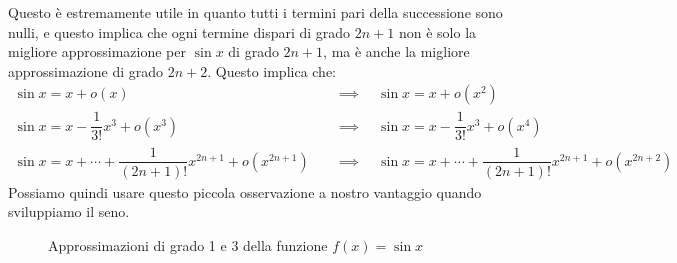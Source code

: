 Questo è estremamente utile in quanto tutti i termini pari della successione 
sono nulli, e questo implica che ogni termine dispari di grado $2n + 1$ non è 
solo la migliore approssimazione per $\sin{x}$ di grado $2n + 1$, ma è anche la 
migliore approssimazione di grado $2n + 2$. Questo implica che:
\begin{align*}
	\sin{x} = x + o(x) \quad &\implies \quad \sin{x} = x + o(x^2)\\[5pt]
	\sin{x} = x - \dfrac{1}{3!}x^3 + o(x^3) \quad &\implies \quad \sin{x} = x - 
    \dfrac{1}{3!}x^3 + o(x^4) \\[5pt]
	\sin{x} = x + \cdots + \dfrac{1}{(2n+1)!} x^{2n +1} + o(x^{2n+1}) \quad 
    &\implies \quad \sin{x} = x + \cdots + \dfrac{1}{(2n+1)!} x^{2n+1} + 
    o(x^{2n+2})
\end{align*}
Possiamo quindi usare questo piccola osservazione a nostro vantaggio quando 
sviluppiamo il seno.\\

\begin{figure}
\centering
\begin{subfigure}{0.49\textwidth}
\centering
\end{subfigure}
\begin{subfigure}{0.49\textwidth}
\centering
\end{subfigure}
	\caption{Approssimazioni di grado 1 e 3 della funzione $f(x) = \sin{x}$} 
\end{figure}


